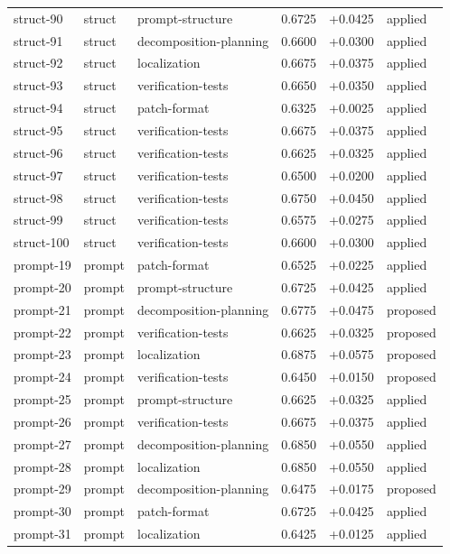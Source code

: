 \begin{center}
\begin{longtable}{llp{5.2cm}rrl}
struct-90 & struct & prompt-structure & 0.6725 & +0.0425 & applied \\
struct-91 & struct & decomposition-planning & 0.6600 & +0.0300 & applied \\
struct-92 & struct & localization & 0.6675 & +0.0375 & applied \\
struct-93 & struct & verification-tests & 0.6650 & +0.0350 & applied \\
struct-94 & struct & patch-format & 0.6325 & +0.0025 & applied \\
struct-95 & struct & verification-tests & 0.6675 & +0.0375 & applied \\
struct-96 & struct & verification-tests & 0.6625 & +0.0325 & applied \\
struct-97 & struct & verification-tests & 0.6500 & +0.0200 & applied \\
struct-98 & struct & verification-tests & 0.6750 & +0.0450 & applied \\
struct-99 & struct & verification-tests & 0.6575 & +0.0275 & applied \\
struct-100 & struct & verification-tests & 0.6600 & +0.0300 & applied \\
prompt-19 & prompt & patch-format & 0.6525 & +0.0225 & applied \\
prompt-20 & prompt & prompt-structure & 0.6725 & +0.0425 & applied \\
prompt-21 & prompt & decomposition-planning & 0.6775 & +0.0475 & proposed \\
prompt-22 & prompt & verification-tests & 0.6625 & +0.0325 & proposed \\
prompt-23 & prompt & localization & 0.6875 & +0.0575 & proposed \\
prompt-24 & prompt & verification-tests & 0.6450 & +0.0150 & proposed \\
prompt-25 & prompt & prompt-structure & 0.6625 & +0.0325 & applied \\
prompt-26 & prompt & verification-tests & 0.6675 & +0.0375 & applied \\
prompt-27 & prompt & decomposition-planning & 0.6850 & +0.0550 & applied \\
prompt-28 & prompt & localization & 0.6850 & +0.0550 & applied \\
prompt-29 & prompt & decomposition-planning & 0.6475 & +0.0175 & proposed \\
prompt-30 & prompt & patch-format & 0.6725 & +0.0425 & applied \\
prompt-31 & prompt & localization & 0.6425 & +0.0125 & applied \\

\end{longtable}
\end{center}
